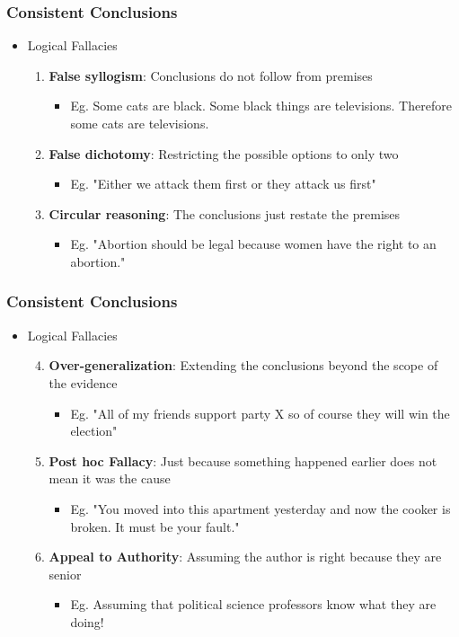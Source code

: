 \documentclass[xcolor=x11names,compress]{beamer}\usepackage[]{graphicx}\usepackage[]{color}
\renewcommand{\(}{\begin{columns}}
\renewcommand{\)}{\end{columns}}
\newcommand{\<}[1]{\begin{column}{#1}}
\renewcommand{\>}{\end{column}}
\begin{document}
\begin{frame}
\frametitle{Consistent Conclusions}
\begin{itemize}
\item Logical Fallacies
\pause
\begin{enumerate}
\item \textbf{False syllogism}: Conclusions do not follow from premises
\begin{itemize}
\item Eg. Some cats are black. Some black things are televisions. Therefore some cats are televisions.
\pause
\end{itemize}
\item \textbf{False dichotomy}: Restricting the possible options to only two
\begin{itemize}
\item Eg. "Either we attack them first or they attack us first"
\pause
\end{itemize}
\item \textbf{Circular reasoning}: The conclusions just restate the premises
\begin{itemize}
\item Eg. "Abortion should be legal because women have the right to an abortion."
\end{itemize}
\end{enumerate}
\end{itemize}
\end{frame}

\begin{frame}
\frametitle{Consistent Conclusions}
\begin{itemize}
\item Logical Fallacies
\pause
\begin{enumerate}
\setcounter{enumi}{3}
\item \textbf{Over-generalization}: Extending the conclusions beyond the scope of the evidence
\begin{itemize}
\item Eg. "All of my friends support party X so of course they will win the election"
\pause
\end{itemize}
\item \textbf{Post hoc Fallacy}: Just because something happened earlier does not mean it was the cause
\begin{itemize}
\item Eg. "You moved into this apartment yesterday and now the cooker is broken. It must be your fault."
\pause
\end{itemize}
\item \textbf{Appeal to Authority}: Assuming the author is right because they are senior
\begin{itemize}
\item Eg. Assuming that political science professors know what they are doing!
\end{itemize}
\end{enumerate}
\end{itemize}
\end{frame}
\end{document}
